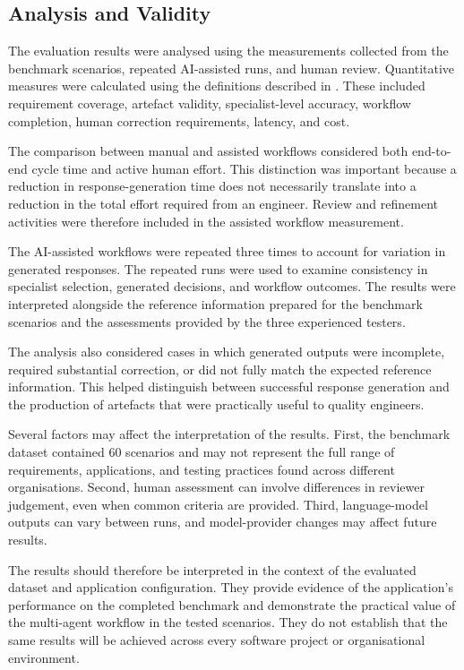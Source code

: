 \subsection{Analysis and Validity}
The evaluation results were analysed using the measurements collected from the benchmark scenarios, repeated AI-assisted runs, and human review. Quantitative measures were calculated using the definitions described in . These included requirement coverage, artefact validity, specialist-level accuracy, workflow completion, human correction requirements, latency, and cost.

The comparison between manual and assisted workflows considered both end-to-end cycle time and active human effort. This distinction was important because a reduction in response-generation time does not necessarily translate into a reduction in the total effort required from an engineer. Review and refinement activities were therefore included in the assisted workflow measurement.

The AI-assisted workflows were repeated three times to account for variation in generated responses. The repeated runs were used to examine consistency in specialist selection, generated decisions, and workflow outcomes. The results were interpreted alongside the reference information prepared for the benchmark scenarios and the assessments provided by the three experienced testers.

The analysis also considered cases in which generated outputs were incomplete, required substantial correction, or did not fully match the expected reference information. This helped distinguish between successful response generation and the production of artefacts that were practically useful to quality engineers.

Several factors may affect the interpretation of the results. First, the benchmark dataset contained 60 scenarios and may not represent the full range of requirements, applications, and testing practices found across different organisations. Second, human assessment can involve differences in reviewer judgement, even when common criteria are provided. Third, language-model outputs can vary between runs, and model-provider changes may affect future results.

The results should therefore be interpreted in the context of the evaluated dataset and application configuration. They provide evidence of the application’s performance on the completed benchmark and demonstrate the practical value of the multi-agent workflow in the tested scenarios. They do not establish that the same results will be achieved across every software project or organisational environment.


